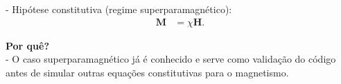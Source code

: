 \documentclass[portrait,a0paper,fontscale=0.40]{baposter} %
\begin{document}
\begin{poster}
{- Hipótese constitutiva (regime superparamagnético): \begin{align}
	\mathbf{M} &= \chi \mathbf{H}.
\end{align}

\textbf{Por quê?}\\
 - O caso superparamagnético já é conhecido e serve como validação do código antes de simular outras equações constitutivas para o magnetismo.\\
\vspace{0.3em} %
}



\end{poster}
\end{document}
